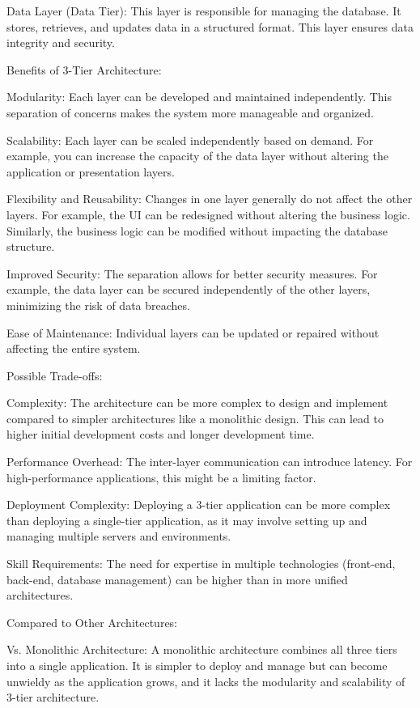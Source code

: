 Data Layer (Data Tier): This layer is responsible for managing the database. It stores, retrieves, and updates data in a structured format. This layer ensures data integrity and security.

Benefits of 3-Tier Architecture:

Modularity: Each layer can be developed and maintained independently. This separation of concerns makes the system more manageable and organized.

Scalability: Each layer can be scaled independently based on demand. For example, you can increase the capacity of the data layer without altering the application or presentation layers.

Flexibility and Reusability: Changes in one layer generally do not affect the other layers. For example, the UI can be redesigned without altering the business logic. Similarly, the business logic can be modified without impacting the database structure.

Improved Security: The separation allows for better security measures. For example, the data layer can be secured independently of the other layers, minimizing the risk of data breaches.

Ease of Maintenance: Individual layers can be updated or repaired without affecting the entire system.

Possible Trade-offs:

Complexity: The architecture can be more complex to design and implement compared to simpler architectures like a monolithic design. This can lead to higher initial development costs and longer development time.

Performance Overhead: The inter-layer communication can introduce latency. For high-performance applications, this might be a limiting factor.

Deployment Complexity: Deploying a 3-tier application can be more complex than deploying a single-tier application, as it may involve setting up and managing multiple servers and environments.

Skill Requirements: The need for expertise in multiple technologies (front-end, back-end, database management) can be higher than in more unified architectures.

Compared to Other Architectures:

Vs. Monolithic Architecture: A monolithic architecture combines all three tiers into a single application. It is simpler to deploy and manage but can become unwieldy as the application grows, and it lacks the modularity and scalability of 3-tier architecture.

